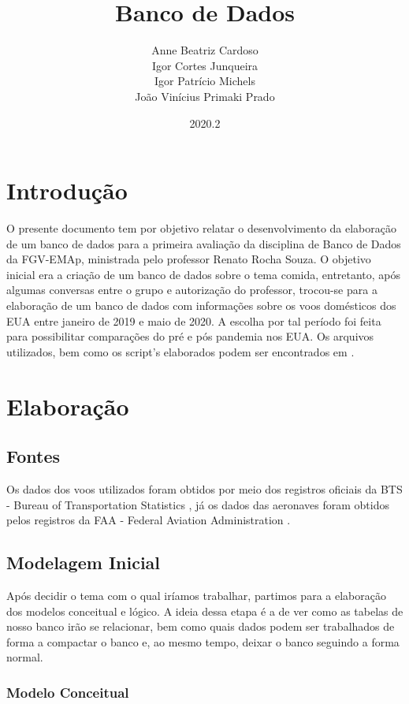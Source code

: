 \documentclass{article}
\title{Banco de Dados}
\author{Anne Beatriz Cardoso \\ Igor Cortes Junqueira \\ Igor Patrício Michels \\ João Vinícius Primaki Prado}
\date{2020.2}
\begin{document}
	
	\maketitle
	
	\section{Introdução}
	
	O presente documento tem por objetivo relatar o desenvolvimento da elaboração de um banco de dados para a primeira avaliação da disciplina de Banco de Dados da FGV-EMAp, ministrada pelo professor Renato Rocha Souza. O objetivo inicial era a criação de um banco de dados sobre o tema comida, entretanto, após algumas conversas entre o grupo e autorização do professor, trocou-se para a elaboração de um banco de dados com informações sobre os voos domésticos dos EUA entre janeiro de 2019 e maio de 2020. A escolha por tal período foi feita para possibilitar comparações do pré e pós pandemia nos EUA. Os arquivos utilizados, bem como os script's elaborados podem ser encontrados em \cite{github}.
	
	\section{Elaboração}
	
	\subsection{Fontes}
	
	Os dados dos voos utilizados foram obtidos por meio dos registros oficiais da BTS - Bureau of Transportation Statistics \cite{BTS}, já os dados das aeronaves foram obtidos pelos registros da FAA - Federal Aviation Administration \cite{FAA}.
	
	\subsection{Modelagem Inicial}
	
	Após decidir o tema com o qual iríamos trabalhar, partimos para a elaboração dos modelos conceitual e lógico. A ideia dessa etapa é a de ver como as tabelas de nosso banco irão se relacionar, bem como quais dados podem ser trabalhados de forma a compactar o banco e, ao mesmo tempo, deixar o banco seguindo a forma normal.
	
	\subsubsection{Modelo Conceitual}
	
\end{document}
